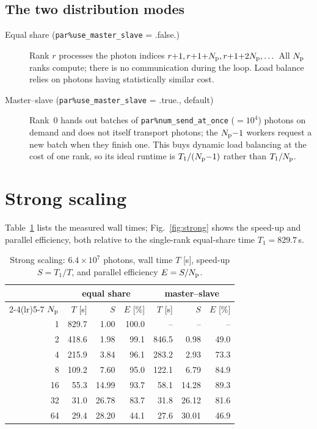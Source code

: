 \documentclass[english,a4paper]{kiseon_memo}
\newcommand{\pp}[1]{\texttt{par\%#1}}
\newcommand{\Np}{N_{\rm p}}
\begin{document}
\subsection{The two distribution modes}
\begin{description}
\item[Equal share (\pp{use\_master\_slave} = .false.)]  Rank $r$ processes the
  photon indices $r{+}1, r{+}1{+}\Np, r{+}1{+}2\Np,\dots$  All $\Np$ ranks
  compute; there is no communication during the loop.  Load balance relies on
  photons having statistically similar cost.
\item[Master--slave (\pp{use\_master\_slave} = .true., default)]  Rank~0 hands
  out batches of \pp{num\_send\_at\_once} ($=10^4$) photons on demand and does
  not itself transport photons; the $\Np{-}1$ workers request a new batch when
  they finish one.  This buys dynamic load balancing at the cost of one rank,
  so its ideal runtime is $T_1/(\Np{-}1)$ rather than $T_1/\Np$.
\end{description}

\section{Strong scaling}

Table~\ref{tab:strong} lists the measured wall times; Fig.~\ref{fig:strong}
shows the speed-up and parallel efficiency, both relative to the single-rank
equal-share time $T_1 = 829.7$\,s.

\begin{table}[htb]
\centering
\caption{Strong scaling: $6.4\times10^{7}$ photons, wall time $T$ [s], speed-up
$S = T_1/T$, and parallel efficiency $E = S/\Np$.}
\label{tab:strong}
\begin{tabular}{r rrr rrr}
\toprule
      & \multicolumn{3}{c}{equal share} & \multicolumn{3}{c}{master--slave}\\
\cmidrule(lr){2-4}\cmidrule(lr){5-7}
$\Np$ & $T$ [s] & $S$ & $E$ [\%] & $T$ [s] & $S$ & $E$ [\%]\\
\midrule
  1 &  829.7 &  1.00 & 100.0 &    --  &   --  &  --  \\
  2 &  418.6 &  1.98 &  99.1 &  846.5 &  0.98 & 49.0 \\
  4 &  215.9 &  3.84 &  96.1 &  283.2 &  2.93 & 73.3 \\
  8 &  109.2 &  7.60 &  95.0 &  122.1 &  6.79 & 84.9 \\
 16 &   55.3 & 14.99 &  93.7 &   58.1 & 14.28 & 89.3 \\
 32 &   31.0 & 26.78 &  83.7 &   31.8 & 26.12 & 81.6 \\
 64 &   29.4 & 28.20 &  44.1 &   27.6 & 30.01 & 46.9 \\
\bottomrule
\end{tabular}
\end{table}
\end{document}
